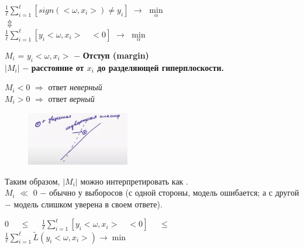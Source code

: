             \begin{center}
                \large{$\frac{1}{\ell} \sum\limits_{i = 1}^\ell [sign(<\omega, x_i>) \neq y_i]$ $\longrightarrow$ $\min\limits_\alpha$\\
                $\Updownarrow$\\
                $\frac{1}{\ell} \sum\limits_{i = 1}^\ell [y_i<\omega, x_i> \quad < 0]$ $\longrightarrow$ $\min\limits_\alpha$\
                }
            \end{center}

            $M_i$ = $y_i<\omega, x_i>$ $-$ \textbf{Отступ (margin)}\\
            $|M_i|$ $-$ \textbf{расстояние от $x_i$ до разделяющей гиперплоскости.}

            \begin{center}
                $M_i < 0 $ $\Longrightarrow$ ответ \textit{неверный}\\
                $M_i > 0 $ $\Longrightarrow$ ответ \textit{верный}
            \end{center}

            \begin{figure}[H]
                \centering
                \includegraphics[width=0.4\textwidth]{images/4lecture/LinearClassification2.png}
            \end{figure}


            Таким образом, $|M_i|$ можно интерпретировать как .\\
            
            $M_i$ $\ll$ $0$ $-$ обычно у выборосов (с одной стороны, модель ошибается; а с другой $-$ модель слишком уверена в своем ответе).\\

            \hline
            \begin{center}
                \large{$0$ $\quad \leq \quad$ $\frac{1}{\ell} \sum\limits_{i = 1}^\ell [y_i<\omega, x_i> \quad < 0]$ $\quad \leq \quad$ $\frac{1}{\ell} \sum\limits_{i = 1}^\ell \tilde{L}(y_i<\omega, x_i>) \longrightarrow \min$}\\
            \end{center}

